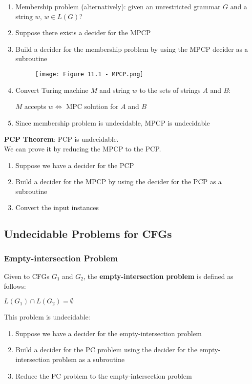 \documentclass{article}
\begin{document}
\begin{enumerate}
    \item Membership problem (alternatively): given an unrestricted grammar $G$ and a string $w$, $w \in L(G)$?
    \item Suppose there exists a decider for the MPCP
    \item Build a decider for the membership problem by using the MPCP decider as a subroutine
    \begin{figure}[H]
        \centering
        \texttt{[image: Figure 11.1 - MPCP.png]}
    \end{figure}
    \item Convert Turing machine $M$ and string $w$ to the sets of strings $A$ and $B$:
    \begin{center}
        $M$ accepts $w \Leftrightarrow$ MPC solution for $A$ and $B$
    \end{center}
    \item Since membership problem is undecidable, MPCP is undecidable
\end{enumerate}
\textbf{PCP Theorem}: PCP is undecidable. \\
We can prove it by reducing the MPCP to the PCP.
\begin{enumerate}
    \item Suppose we have a decider for the PCP
    \item Build a decider for the MPCP by using the decider for the PCP as a subroutine
    \item Convert the input instances
\end{enumerate}
\subsection{Undecidable Problems for CFGs}
\subsubsection{Empty-intersection Problem}
Given to CFGs $G_1$ and $G_2$, the \textbf{empty-intersection problem} is defined as follows:
\begin{center}
    $L(G_1) \cap L(G_2) = \emptyset$
\end{center}
This problem is undecidable:
\begin{enumerate}
    \item Suppose we have a decider for the empty-intersection problem
    \item Build a decider for the PC problem using the decider for the empty-intersection problem as a subroutine
    \item Reduce the PC problem to the empty-intersection problem
\end{enumerate}
\end{document}
